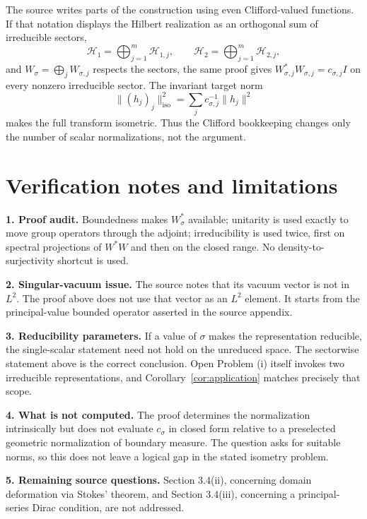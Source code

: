 \documentclass[11pt]{article}
\begin{document}
The source writes parts of the construction using even Clifford-valued
functions.  If that notation displays the Hilbert realization as an orthogonal
sum of irreducible sectors,
\[
  \mathcal H_1=\bigoplus_{j=1}^m\mathcal H_{1,j},\qquad
  \mathcal H_2=\bigoplus_{j=1}^m\mathcal H_{2,j},
\]
and $W_\sigma=\bigoplus_j W_{\sigma,j}$ respects the sectors, the same proof
gives $W_{\sigma,j}^*W_{\sigma,j}=c_{\sigma,j}I$ on every nonzero irreducible
sector.  The invariant target norm
\[
  \|(h_j)_j\|_{\mathrm{iso}}^2
   =\sum_j c_{\sigma,j}^{-1}\|h_j\|^2
\]
makes the full transform isometric.  Thus the Clifford bookkeeping changes
only the number of scalar normalizations, not the argument.

\section{Verification notes and limitations}

\noindent\textbf{1. Proof audit.}  Boundedness makes $W_\sigma^*$ available;
unitarity is used exactly to move group operators through the adjoint;
irreducibility is used twice, first on spectral projections of $W^*W$ and
then on the closed range.  No density-to-surjectivity shortcut is used.

\par\medskip\noindent\textbf{2. Singular-vacuum issue.}  The source notes that its vacuum
vector is not in $L^2$.  The proof above does not use that vector as an
$L^2$ element.  It starts from the principal-value bounded operator asserted
in the source appendix.

\par\medskip\noindent\textbf{3. Reducibility parameters.}  If a value of $\sigma$ makes the
representation reducible, the single-scalar statement need not hold on the
unreduced space.  The sectorwise statement above is the correct conclusion.
Open Problem (i) itself invokes two irreducible representations, and
Corollary~\ref{cor:application} matches precisely that scope.

\par\medskip\noindent\textbf{4. What is not computed.}  The proof determines the normalization
intrinsically but does not evaluate $c_\sigma$ in closed form relative to a
preselected geometric normalization of boundary measure.  The question asks
for suitable norms, so this does not leave a logical gap in the stated
isometry problem.

\par\medskip\noindent\textbf{5. Remaining source questions.}  Section 3.4(ii), concerning
domain deformation via Stokes' theorem, and Section 3.4(iii), concerning a
principal-series Dirac condition, are not addressed.
\end{document}
